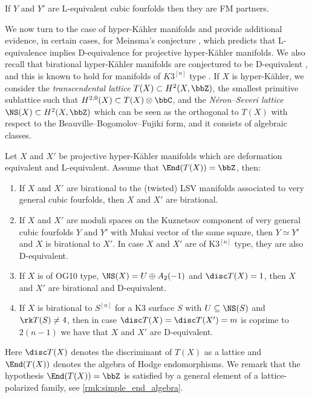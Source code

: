 \documentclass{amsart}
\begin{document}
\begin{conjecture}
\label{thm:main_special_cubic}
     If \(Y\) and \(Y'\) are L-equivalent cubic fourfolds then they are FM partners.
\end{conjecture}


We now turn to the case of hyper-Kähler manifolds and provide additional evidence, in certain cases, for Meinsma's conjecture \cite[Conjecture 1.5]{meinsma2025counterexamples}, which predicts that L-equivalence implies D-equivalence for projective hyper-Kähler manifolds. We also recall that birational hyper-Kähler manifolds are conjectured to be D-equivalent \cite{bondal1995semiorthogonal,kawamata2002d}, and this is known to hold for manifolds of $K3^{[n]}$ type \cite{maulik2025d}. If \(X\) is hyper-Kähler, we consider the \textit{transcendental lattice} \(T(X)\subset H^2(X,\bbZ)\), the smallest primitive sublattice such that \(H^{2,0}(X)\subset T(X)\otimes \bbC\), and the \textit{Néron--Severi lattice} \(\NS(X)\subset H^2(X,\bbZ)\) which can be seen as the orthogonal to \(T(X)\) with respect to the Beauville--Bogomolov--Fujiki form, and it consists of algebraic classes. 
\begin{theorem}
    Let \(X\) and \(X'\) be projective hyper-Kähler manifolds which are deformation equivalent and L-equivalent. Assume that \(\End(T(X))=\bbZ\), then:
    \begin{enumerate}
        \item If \(X\) and \(X'\) are birational to the (twisted) LSV manifolds associated to very general cubic fourfolds, then \(X\) and \(X'\) are birational.
        
        \item If $X$ and $X'$ are moduli spaces on the Kuznetsov component of very general cubic fourfolds $Y$ and $Y'$ with Mukai vector of the same square, then $Y\simeq Y'$ and $X$ is birational to $X'$. 
        In case \(X\) and \(X'\) are of K3\(^{[n]}\) type, they are also D-equivalent.
        \item If \(X\) is of OG10 type, \(\NS(X)=U\oplus A_2(-1)\) and \(\disc T(X)=1\), then \(X\) and \(X'\) are birational and D-equivalent.
        \item If \(X\) is birational to \(S^{[n]}\) for a K3 surface \(S\) with \(U\subseteq \NS(S)\) and \(\rk T(S)\not=4\), then in case \(\disc T(X)=\disc T(X')=m\) is coprime to \(2(n-1)\) we have that \(X\) and \(X'\) are D-equivalent. 
    \end{enumerate}
\end{theorem}
Here \(\disc T(X)\) denotes the discriminant of \(T(X)\) as a lattice and \(\End(T(X))\) denotes the algebra of Hodge endomorphisms. We remark that the hypothesis \(\End(T(X))=\bbZ\) is satisfied by a general element of a lattice-polarized family, see \autoref{rmk:simple_end_algebra}.
\end{document}

